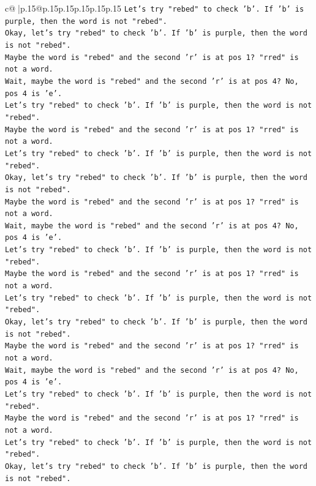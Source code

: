 \documentclass{article}
\begin{document}
{\begin{supertabular}{c@{$\;$}|p{.15\linewidth}@{}p{.15\linewidth}p{.15\linewidth}p{.15\linewidth}p{.15\linewidth}p{.15\linewidth}}
{{{\texttt{Let's try "rebed" to check 'b'. If 'b' is purple, then the word is not "rebed".} \\
\texttt{Okay, let's try "rebed" to check 'b'. If 'b' is purple, then the word is not "rebed".} \\
\texttt{Maybe the word is "rebed" and the second 'r' is at pos 1? "rred" is not a word.} \\
\texttt{Wait, maybe the word is "rebed" and the second 'r' is at pos 4? No, pos 4 is 'e'.} \\
\texttt{Let's try "rebed" to check 'b'. If 'b' is purple, then the word is not "rebed".} \\
\texttt{Maybe the word is "rebed" and the second 'r' is at pos 1? "rred" is not a word.} \\
\texttt{Let's try "rebed" to check 'b'. If 'b' is purple, then the word is not "rebed".} \\
\texttt{Okay, let's try "rebed" to check 'b'. If 'b' is purple, then the word is not "rebed".} \\
\texttt{Maybe the word is "rebed" and the second 'r' is at pos 1? "rred" is not a word.} \\
\texttt{Wait, maybe the word is "rebed" and the second 'r' is at pos 4? No, pos 4 is 'e'.} \\
\texttt{Let's try "rebed" to check 'b'. If 'b' is purple, then the word is not "rebed".} \\
\texttt{Maybe the word is "rebed" and the second 'r' is at pos 1? "rred" is not a word.} \\
\texttt{Let's try "rebed" to check 'b'. If 'b' is purple, then the word is not "rebed".} \\
\texttt{Okay, let's try "rebed" to check 'b'. If 'b' is purple, then the word is not "rebed".} \\
\texttt{Maybe the word is "rebed" and the second 'r' is at pos 1? "rred" is not a word.} \\
\texttt{Wait, maybe the word is "rebed" and the second 'r' is at pos 4? No, pos 4 is 'e'.} \\
\texttt{Let's try "rebed" to check 'b'. If 'b' is purple, then the word is not "rebed".} \\
\texttt{Maybe the word is "rebed" and the second 'r' is at pos 1? "rred" is not a word.} \\
\texttt{Let's try "rebed" to check 'b'. If 'b' is purple, then the word is not "rebed".} \\
\texttt{Okay, let's try "rebed" to check 'b'. If 'b' is purple, then the word is not "rebed".} \\
}}}
\end{supertabular}}
\end{document}
